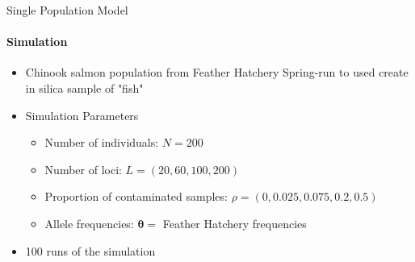 \documentclass[letter,graphicx]{beamer}
\begin{document}
\begin{frame}{Single Population Model}
\framesubtitle{Simulation}
\begin{itemize}
\item Chinook salmon population from Feather Hatchery Spring-run to used create in silica sample of "fish"
\vspace{3mm}
\item Simulation Parameters
	\begin{itemize}
	\item Number of individuals: $N = 200$
	\vspace{1.5mm}
	\item Number of loci: $L =  (20, 60, 100, 200)$
	\vspace{1.5mm}
	\item Proportion of contaminated samples: $\rho = (0, 0.025, 0.075, 0.2, 0.5)$
	\vspace{1.5mm}
	\item Allele frequencies: $\boldsymbol{\theta} =$ Feather Hatchery frequencies 
	\end{itemize}
	\vspace{3mm}
\item 100 runs of the simulation
\end{itemize}
\end{frame}
\end{document}
